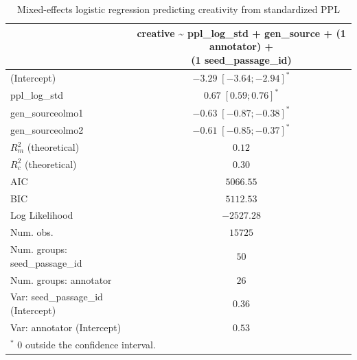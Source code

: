 
\usepackage{booktabs}

\begin{table}[htbp]
\begin{center}
\begin{tabular}{l c}
\toprule
 & \shortstack[l]{creative \textasciitilde{} ppl\_log\_std + gen\_source + (1 \textbar{} annotator) + \\ 
(1 \textbar{} seed\_passage\_id)} \\
\midrule
(Intercept)                        & $-3.29 \; [-3.64; -2.94]^{*}$ \\
ppl\_log\_std                      & $0.67 \; [ 0.59;  0.76]^{*}$  \\
gen\_sourceolmo1                   & $-0.63 \; [-0.87; -0.38]^{*}$ \\
gen\_sourceolmo2                   & $-0.61 \; [-0.85; -0.37]^{*}$ \\
\midrule
$R^2_m$ (theoretical)              & $0.12$                        \\
$R^2_c$ (theoretical)              & $0.30$                        \\
AIC                                & $5066.55$                     \\
BIC                                & $5112.53$                     \\
Log Likelihood                     & $-2527.28$                    \\
Num. obs.                          & $15725$                       \\
Num. groups: seed\_passage\_id     & $50$                          \\
Num. groups: annotator             & $26$                          \\
Var: seed\_passage\_id (Intercept) & $0.36$                        \\
Var: annotator (Intercept)         & $0.53$                        \\
\bottomrule
\multicolumn{2}{l}{\scriptsize{$^*$ 0 outside the confidence interval.}}
\end{tabular}
\caption{Mixed-effects logistic regression predicting creativity from standardized PPL}
\label{tab:glmer_ppl}
\end{center}
\end{table}
